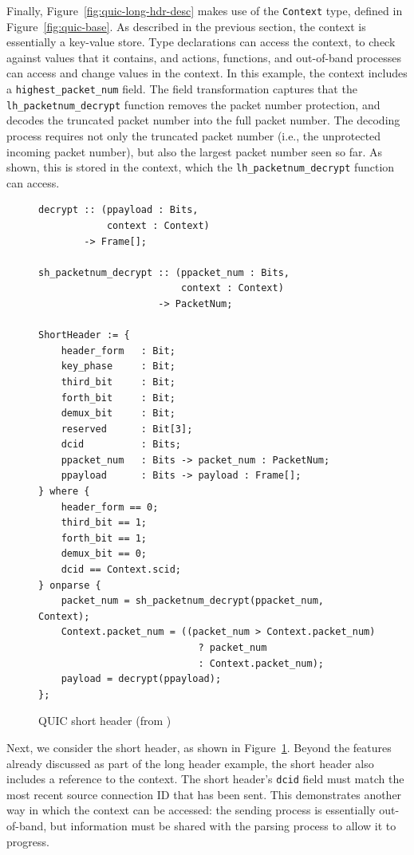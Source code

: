 \documentclass[10pt,sigconf]{acmart}
\begin{document}
Finally, Figure~\ref{fig:quic-long-hdr-desc} makes use of the \texttt{Context} type,
defined in Figure~\ref{fig:quic-base}. As
described in the previous section, the context is essentially a key-value store. Type
declarations can access the context, to check against values that it contains, and actions,
functions, and out-of-band processes can access and change values in the context. In
this example, the context includes a \texttt{highest\_packet\_num} field. The field
transformation captures that the
\texttt{lh\_packetnum\_decrypt} function removes the packet
number protection, and decodes the truncated packet number into the full packet number.
The decoding process requires not only the truncated packet number (i.e., the unprotected
incoming packet number), but also the largest packet number seen so far. As shown, this is
stored in the context, which the \texttt{lh\_packetnum\_decrypt} function can access.

\begin{figure}
	\vspace{3mm}
    \begin{BVerbatim}[fontsize=\scriptsize]
decrypt :: (ppayload : Bits, 
            context : Context) 
        -> Frame[];

sh_packetnum_decrypt :: (ppacket_num : Bits, 
                         context : Context) 
                     -> PacketNum;
                     
ShortHeader := {
	header_form   : Bit;
	key_phase     : Bit;
	third_bit     : Bit;
	forth_bit     : Bit;
	demux_bit     : Bit;
	reserved      : Bit[3];
	dcid          : Bits;
	ppacket_num   : Bits -> packet_num : PacketNum;
	ppayload      : Bits -> payload : Frame[];
} where {
	header_form == 0;
	third_bit == 1;
	forth_bit == 1;
	demux_bit == 0;
	dcid == Context.scid;
} onparse {
	packet_num = sh_packetnum_decrypt(ppacket_num, Context);
	Context.packet_num = ((packet_num > Context.packet_num)
	                        ? packet_num 
	                        : Context.packet_num);
	payload = decrypt(ppayload);
};
    \end{BVerbatim}
    \caption{QUIC short header (from \cite{draft-ietf-quic-transport-latest})}
    \label{fig:quic-short-hdr-desc}
\end{figure}

Next, we consider the short header, as shown in Figure~\ref{fig:quic-short-hdr-desc}.
Beyond the features already discussed as part of the long header example, the short header
also includes a reference to the context. The short header's \texttt{dcid} field must
match the most recent source connection ID that has been sent. This demonstrates another
way in which the context can be accessed: the sending process is essentially out-of-band,
but information must be shared with the parsing process to allow it to progress.
\end{document}
